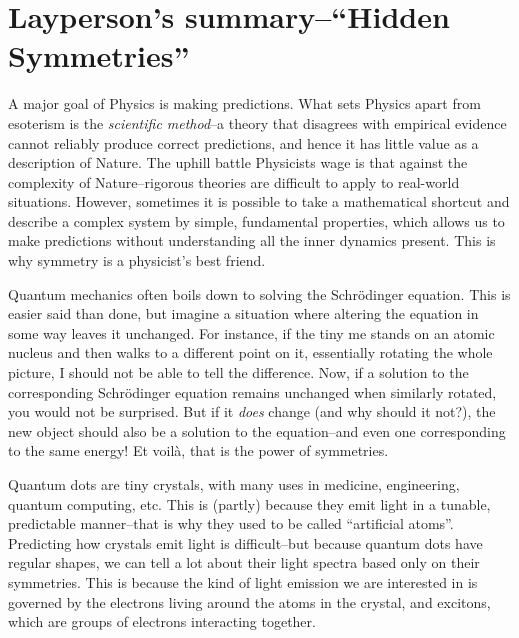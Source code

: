 
\section[Layperson's summary]{Layperson's summary--``Hidden Symmetries''}
\thispagestyle{empty}

A major goal of Physics is making predictions. What sets Physics apart from esoterism is the \textit{scientific method}--a theory that disagrees with empirical evidence cannot reliably produce correct predictions, and hence it has little value as a description of Nature. The uphill battle Physicists wage is that against the complexity of Nature--rigorous theories are difficult to apply to real-world situations. However, sometimes it is possible to take a mathematical shortcut and describe a complex system by simple, fundamental properties, which allows us to make predictions without understanding all the inner dynamics present. This is why symmetry is a physicist's best friend.

Quantum mechanics often boils down to solving the Schrödinger equation. This is easier said than done, but imagine a situation where altering the equation in some way leaves it unchanged. For instance, if the tiny me stands on an atomic nucleus and then walks to a different point on it, essentially rotating the whole picture, I should not be able to tell the difference. Now, if a solution to the corresponding Schrödinger equation remains unchanged when similarly rotated, you would not be surprised. But if it \textit{does} change (and why should it not?), the new object should also be a solution to the equation--and even one corresponding to the same energy! Et voilà, that is the power of symmetries.

Quantum dots are tiny crystals, with many uses in medicine, engineering, quantum computing, etc. This is (partly) because they emit light in a tunable, predictable manner--that is why they used to be called ``artificial atoms''. Predicting how crystals emit light is difficult--but because quantum dots have regular shapes, we can tell a lot about their light spectra based only on their symmetries. This is because the kind of light emission we are interested in is governed by the electrons living around the atoms in the crystal, and excitons, which are groups of electrons interacting together.

